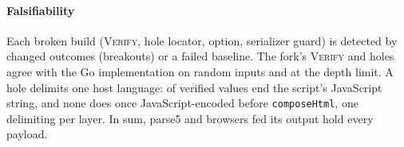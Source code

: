 \paragraph{Falsifiability}
Each broken build (\textsc{Verify}, hole locator, option, serializer guard) is
detected by changed outcomes (\dataHtmlSabotageBreakouts breakouts) or a failed baseline. The fork's \textsc{Verify} and holes agree with the Go
implementation on random inputs and at the depth limit.
A hole delimits one host language: \dataHtmlJsHoleEnds of \dataHtmlJsCases
verified values end the script's JavaScript string, and none does once
JavaScript-encoded before \texttt{composeHtml}, one delimiting per layer.
In sum, parse5 and browsers fed its output hold every payload.
